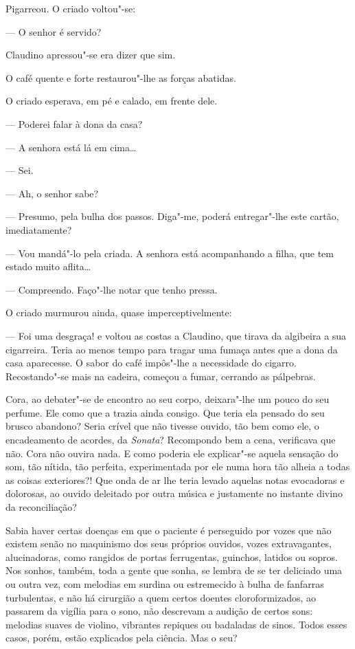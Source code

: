 Pigarreou. O criado voltou"-se:

--- O senhor é servido?

Claudino apressou"-se era dizer que sim.

O café quente e forte restaurou"-lhe as forças abatidas.

O criado esperava, em pé e calado, em frente dele.

--- Poderei falar à dona da casa?

--- A senhora está lá em cima\ldots{}

--- Sei.

--- Ah, o senhor sabe?

--- Presumo, pela bulha dos passos. Diga"-me, poderá entregar"-lhe este
cartão, imediatamente?

--- Vou mandá"-lo pela criada. A senhora está acompanhando a filha, que
tem estado muito aflita\ldots{}

--- Compreendo. Faço"-lhe notar que tenho pressa.

O criado murmurou ainda, quase imperceptivelmente:

--- Foi uma desgraça! e voltou as costas a Claudino, que tirava da
algibeira a sua cigarreira. Teria ao menos tempo para tragar uma fumaça
antes que a dona da casa aparecesse. O sabor do café impôs"-lhe a
necessidade do cigarro. Recostando"-se mais na
cadeira, começou a fumar, cerrando as pálpebras.

Cora, ao debater"-se de encontro ao seu corpo, deixara"-lhe um pouco do
seu perfume. Ele como que a trazia ainda consigo. Que teria ela pensado
do seu brusco abandono? Seria crível que não tivesse ouvido, tão bem
como ele, o encadeamento de acordes, da \emph{Sonata}? Recompondo bem a
cena, verificava que não. Cora não ouvira nada. E como poderia ele
explicar"-se aquela sensação do som, tão nítida, tão perfeita,
experimentada por ele numa hora tão alheia a todas as coisas
exteriores?! Que onda de ar lhe teria levado aquelas notas evocadoras e
dolorosas, ao ouvido deleitado por outra música e justamente no instante
divino da reconciliação?

Sabia haver certas doenças em que o paciente é perseguido por vozes que
não existem senão no maquinismo dos seus próprios ouvidos, vozes
extravagantes, alucinadoras, como rangidos de portas ferrugentas,
guinchos, latidos ou sopros. Nos sonhos, também, toda a gente que sonha,
se lembra de se ter deliciado uma ou outra vez, com melodias em surdina
ou estremecido à bulha de fanfarras turbulentas, e não há cirurgião a
quem certos doentes cloroformizados, ao passarem da vigília para o sono,
não descrevam a audição de certos sons: melodias suaves de violino,
vibrantes repiques ou badaladas de sinos. Todos esses casos, porém,
estão explicados pela ciência. Mas o seu?

